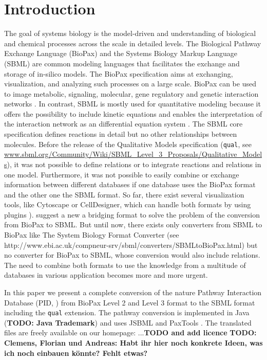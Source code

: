 \documentclass{bioinfo}
\newcommand{\qual}{\texttt{qual}}
\begin{document}
\section{Introduction}
The goal of systems biology is the model-driven and understanding of biological and chemical processes across the scale in detailed levels.
The Biological Pathway Exchange Language (BioPax) and the Systems Biology Markup Language (SBML) are common modeling languages that facilitates the exchange and storage of in-silico models.
The BioPax specification aims at exchanging, visualization, and analyzing such processes on a large scale.
BioPax can be used to image metabolic, signaling, molecular, gene regulatory and genetic interaction networks \citep{Demir2010}.
In contrast, SBML is mostly used for quantitative modeling because it offers the possibility to include kinetic equations and enables the interpretation of the interaction network as an differential equation system \citep{Hucka2003}.
The SBML core specification defines reactions in detail but no other relationships between molecules.
Before the release of the Qualitative Models specification (\qual, see %
\href{http://sbml.org/Community/Wiki/SBML_Level_3_Proposals/Qualitative_Models}
{www.sbml.org/Community/Wiki/SBML\_Level\_3\_Proposals/Qualitative\_Models}), it was not possible to define relations or to integrate reactions and relations in one model.
Furthermore, it was not possible to easily combine or exchange information between different databases if one database uses the BioPax format and the other one the SBML format.
So far, there exist several visualization tools, like Cytoscape or CellDesigner, which can handle both formats by using plugins \citep{Mi2011, Funahashi2007, Smoot2011a, Zinovyev2008}).
\citet*{Ruebenacker2009} suggest a new a bridging format to solve the problem of the conversion from BioPax to SBML.
But until now, there exists only converters from SBML to BioPax like The System Biology Format Converter (see http://www.ebi.ac.uk/compneur-srv/sbml/converters/SBMLtoBioPax.html) but no converter for BioPax to SBML, whose conversion would also include relations.
The need to combine both formats to use the knowledge from a multitude of databases in various application becomes more and more urgent.

In this paper we present a complete conversion of the nature Pathway Interaction Database (PID, \citet{Schaefer2009}) from BioPax Level 2 and Level 3 format to the SBML format including the \qual{} extension.
The pathway conversion is implemented in Java (\textbf{TODO: Java Trademark}) and uses JSBML \citep{Draeger2011} and PaxTools \citep{Demir2010}.
The translated files are freely available on our homepage: ...\textbf{TODO and add licence}
\textbf{TODO: Clemens, Florian und Andreas: Habt ihr hier noch konkrete Ideen, was ich noch einbauen k\"onnte? Fehlt etwas?}
\end{document}

